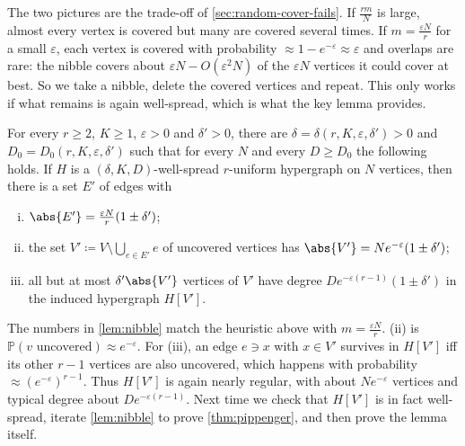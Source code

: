 The two pictures are the trade-off of \autoref{sec:random-cover-fails}. If \(\frac{rm}{N}\) is large, almost every vertex is covered but many are covered several times. If \(m = \frac{\varepsilon N}{r}\) for a small \(\varepsilon\), each vertex is covered with probability \(\approx 1 - e^{-\varepsilon} \approx \varepsilon\) and overlaps are rare: the nibble covers about \(\varepsilon N - O(\varepsilon^{2} N)\) of the \(\varepsilon N\) vertices it could cover at best. So we take a nibble, delete the covered vertices and repeat. This only works if what remains is again well-spread, which is what the key lemma provides.

\begin{lemma}\label{lem:nibble}
    For every \(r \ge 2\), \(K \ge 1\), \(\varepsilon > 0\) and \(\delta' > 0\), there are \(\delta = \delta(r,K,\varepsilon,\delta') > 0\) and \(D_0 = D_0(r,K,\varepsilon,\delta')\) such that for every \(N\) and every \(D \ge D_0\) the following holds. If \(H\) is a \((\delta, K, D)\)-well-spread \(r\)-uniform hypergraph on \(N\) vertices, then there is a set \(E'\) of edges with
    \begin{enumerate}[(i)]
        \item \(\abs{E'} = \frac{\varepsilon N}{r} (1 \pm \delta')\);
        \item the set \(V' \coloneqq V \setminus \bigcup_{e \in E'} e\) of uncovered vertices has \(\abs{V'} = N e^{-\varepsilon} (1 \pm \delta')\);
        \item all but at most \(\delta' \abs{V'}\) vertices of \(V'\) have degree \(D e^{-\varepsilon(r-1)} (1 \pm \delta')\) in the induced hypergraph \(H[V']\).
    \end{enumerate}
\end{lemma}

The numbers in \autoref{lem:nibble} match the heuristic above with \(m = \frac{\varepsilon N}{r}\). (ii) is \(\mathbb{P}(v \text{ uncovered}) \approx e^{-\varepsilon}\). For (iii), an edge \(e \ni x\) with \(x \in V'\) survives in \(H[V']\) iff its other \(r - 1\) vertices are also uncovered, which happens with probability \(\approx (e^{-\varepsilon})^{r-1}\). Thus \(H[V']\) is again nearly regular, with about \(N e^{-\varepsilon}\) vertices and typical degree about \(D e^{-\varepsilon(r-1)}\). Next time we check that \(H[V']\) is in fact well-spread, iterate \autoref{lem:nibble} to prove \autoref{thm:pippenger}, and then prove the lemma itself.
